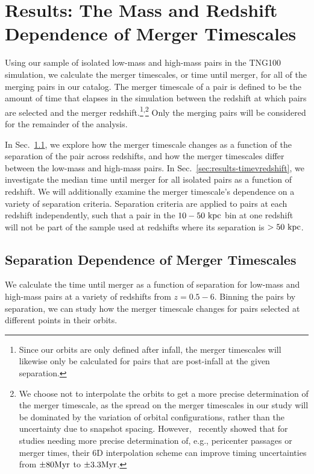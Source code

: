 \documentclass[twocolumn,linenumbers]{aastex631}
\begin{document}
\section{Results: The Mass and Redshift Dependence of Merger Timescales}\label{sec:results}
    Using our sample of isolated low-mass and high-mass pairs in the TNG100 simulation, we calculate the merger timescales, or time until merger, for all of the merging pairs in our catalog. 
    The merger timescale of a pair is defined to be the amount of time that elapses in the simulation between the redshift at which pairs are selected and the merger redshift.\footnote{Since our orbits are only defined after infall, the merger timescales will likewise only be calculated for pairs that are post-infall at the given separation.}\textsuperscript{,}\footnote{We choose not to interpolate the orbits to get a more precise determination of the merger timescale, as the spread on the merger timescales in our study will be dominated by the variation of orbital configurations, rather than the uncertainty due to snapshot spacing. However,~\citet{Patton2024} recently showed that for studies needing more precise determination of, e.g., pericenter passages or merger times, their 6D interpolation scheme can improve timing uncertainties from $\pm80\mathrm{Myr}$ to $\pm3.3\mathrm{Myr}$.}
    Only the merging pairs will be considered for the remainder of the analysis.
    
    In Sec.~\ref{sec:results-timevsep}, we explore how the merger timescale changes as a function of the separation of the pair across redshifts, and how the merger timescales differ between the low-mass and high-mass pairs. 
    In Sec.~\ref{sec:results-timevredshift}, we investigate the median time until merger for all isolated pairs as a function of redshift. 
    We will additionally examine the merger timescale's dependence on a variety of separation criteria. 
    Separation criteria are applied to pairs at each redshift independently, such that a pair in the $10-50\,\mathrm{\,kpc}$ bin at one redshift will not be part of the sample used at redshifts where its separation is $>50\,\mathrm{\,kpc}$.



\subsection{Separation Dependence of Merger Timescales}\label{sec:results-timevsep}
    We calculate the time until merger as a function of separation for low-mass and high-mass pairs at a variety of redshifts from $z=0.5-6$. 
    Binning the pairs by separation, we can study how the merger timescale changes for pairs selected at different points in their orbits. 
    
\end{document}
